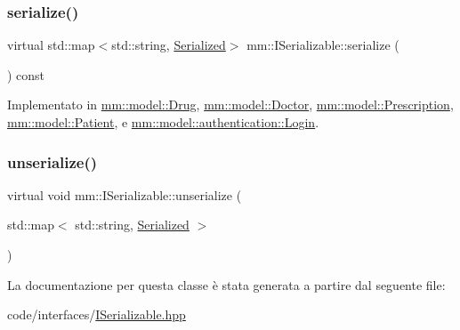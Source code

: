 \subsubsection{\texorpdfstring{serialize()}{serialize()}}
{\footnotesize\ttfamily virtual std\+::map$<$std\+::string, \mbox{\hyperlink{structmm_1_1_serialized}{Serialized}}$>$ mm\+::\+I\+Serializable\+::serialize (\begin{DoxyParamCaption}{ }\end{DoxyParamCaption}) const\hspace{0.3cm}{\ttfamily [pure virtual]}}



Implementato in \mbox{\hyperlink{classmm_1_1model_1_1_drug_a5d4fa5bf5e4700f833547c5114764c7b}{mm\+::model\+::\+Drug}}, \mbox{\hyperlink{classmm_1_1model_1_1_doctor_a2171a9cb9c8a24ad0c0331edae957910}{mm\+::model\+::\+Doctor}}, \mbox{\hyperlink{classmm_1_1model_1_1_prescription_a592ff88dfa9625a383a7b073a64863b1}{mm\+::model\+::\+Prescription}}, \mbox{\hyperlink{classmm_1_1model_1_1_patient_ae3ac219cd109e8c53daaf9b2758c3a0e}{mm\+::model\+::\+Patient}}, e \mbox{\hyperlink{structmm_1_1model_1_1authentication_1_1_login_a69ec1a769ef1659b8ed39d5e23c24333}{mm\+::model\+::authentication\+::\+Login}}.

\mbox{\label{classmm_1_1_i_serializable_a8e5329b3b23cd0dff0ea8f5f63bab996}} 
\subsubsection{\texorpdfstring{unserialize()}{unserialize()}}
{\footnotesize\ttfamily virtual void mm\+::\+I\+Serializable\+::unserialize (\begin{DoxyParamCaption}\item[{std\+::map$<$ std\+::string, \mbox{\hyperlink{structmm_1_1_serialized}{Serialized}} $>$}]{ }\end{DoxyParamCaption})\hspace{0.3cm}{\ttfamily [pure virtual]}}



La documentazione per questa classe è stata generata a partire dal seguente file\+:\begin{DoxyCompactItemize}
\item 
code/interfaces/\mbox{\hyperlink{_i_serializable_8hpp}{I\+Serializable.\+hpp}}\end{DoxyCompactItemize}

